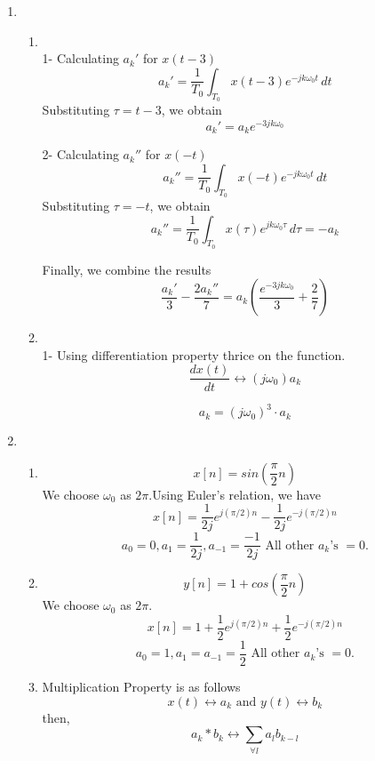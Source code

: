 \documentclass[10pt,a4paper, margin=1in]{article}
\begin{document}
\begin{enumerate}
\item %
    \begin{enumerate}
    \item %
    ~\\
    1- Calculating $a_k'$ for $x(t-3)$
    \[ a_k' = \frac{1}{T_0} \int_{T_0} x(t-3) e^{-jk\omega_0 t} \,dt\]
    Substituting $\tau = t - 3$, we obtain
    \[ a_k' = a_k e^{-3jk\omega_0}\]
    
    2- Calculating $a_k''$ for $x(-t)$
    \[ a_k'' = \frac{1}{T_0} \int_{T_0} x(-t) e^{-jk\omega_0 t} \,dt\]
    Substituting $\tau = -t$, we obtain
    \[ a_k'' =  \frac{1}{T_0} \int_{T_0} x(\tau) e^{jk\omega_0 \tau} \,d\tau = -a_k\]
    
    Finally, we combine the results
    \[\frac{a_k'}{3} - \frac{2a_k''}{7} = a_k (\frac{e^{-3jk\omega_0}}{3} + \frac{2}{7})\]
    
    \item %
    
    ~\\
    1- 
    Using differentiation property thrice on the function.
    \[ \frac{dx(t)}{dt} \longleftrightarrow (j\omega_0)a_k \]
    
    \[ a_k = (j\omega_0)^3 \cdot a_k \]
    
    
    \end{enumerate}

\item %
    \begin{enumerate}
    \item %
    \[ x[n] = sin(\frac{\pi}{2} n)\]
    We choose $\omega_0$ as $2\pi$.Using Euler's relation, we have
    \[ x[n] = \frac{1}{2j} e^{j(\pi/2)n} - \frac{1}{2j} e^{-j(\pi/2)n} \]
    \[ a_0 = 0, a_1 = \frac{1}{2j}, a_{-1} = \frac{-1}{2j} \text{ All other } a_k \text{'s } = 0. \]
    \item %
    \[ y[n] = 1 + cos(\frac{\pi}{2} n)\]
    We choose $\omega_0$ as $2\pi$.
    \[ x[n] = 1 + \frac{1}{2} e^{j(\pi/2)n} + \frac{1}{2} e^{-j(\pi/2)n} \]
    \[ a_0 = 1, a_1 = a_{-1} = \frac{1}{2} \text{ All other } a_k \text{'s } = 0. \]
    \item %
    Multiplication Property is as follows
    \[ x(t) \longleftrightarrow a_k \text{ and } y(t) \longleftrightarrow b_k \]
    then,
    \[ a_k * b_k \longleftrightarrow \sum_{\forall l} a_l b_{k-l} \]
    

\end{enumerate}
\end{enumerate}
\end{document}
